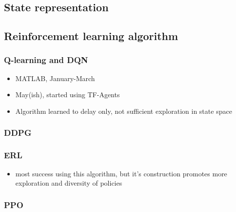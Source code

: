 \documentclass[twocolumn, aps, prd]{revtex4-2}
\begin{document}

\subsection{State representation}


\subsection{Reinforcement learning algorithm}


\subsubsection{Q-learning and DQN}


\begin{itemize}

\item
  MATLAB, January-March
\item
  May(ish), started using TF-Agents
\item
  Algorithm learned to delay only, not sufficient exploration in state
  space
\end{itemize}

\subsubsection{DDPG}


\cite{lillicrap2015continuous}

\subsubsection{ERL}


\begin{itemize}

\item
  most success using this algorithm, but it's construction promotes more
  exploration and diversity of policies
\end{itemize}

\subsubsection{PPO}
\end{document}
